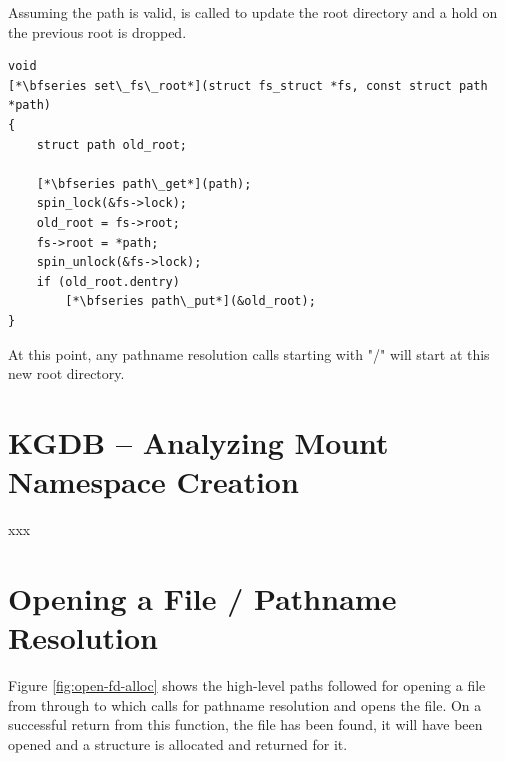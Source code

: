 \noindent
Assuming the path is valid,  is called to update the root directory and a hold on the previous root is dropped.

\begin{lstlisting}
void 
[*\bfseries set\_fs\_root*](struct fs_struct *fs, const struct path *path)
{
    struct path old_root;

    [*\bfseries path\_get*](path);
    spin_lock(&fs->lock);
    old_root = fs->root;
    fs->root = *path;
    spin_unlock(&fs->lock);
    if (old_root.dentry)
        [*\bfseries path\_put*](&old_root);
}
\end{lstlisting}

\noindent
At this point, any pathname resolution calls starting with "/" will start at this new root directory.


\section{KGDB -- Analyzing Mount Namespace Creation}

xxx


\section{Opening a File / Pathname Resolution}\label{openfile}

Figure \ref{fig:open-fd-alloc} shows the high-level paths followed for opening a file from  through to  which calls for pathname resolution and opens the file. On a successful return from this function, the file has been found, it will have been opened and a  structure is allocated and returned for it.

